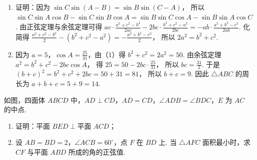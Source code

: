 \begin{solution}
\begin{enumerate}
\item 证明：因为
\(\sin C\sin \left( A-B \right)=\sin B\sin \left( C-A \right)\)，
所以
\(\sin C\sin A\cos B-\sin C\sin B\cos A =\sin B\sin C\cos A-\sin B\sin A\cos C\).
由正弦定理与余弦定理可得 \(ac\cdot \frac{a^2+c^2-b^2}{2ac}-2bc\cdot \frac{b^2+c^2-a^2}{2bc}=-ab\cdot \frac{a^2+b^2-c^2}{2ab}\).
化简得
\(\frac{a^2+c^2-b^2}{2}-\left( b^2+c^2-a^2 \right) =-\frac{a^2+b^2-c^2}{2}\)，
所以
\(2a^2=b^2+c^2\).

\item 因为 \(a=5\)，\(\cos A=\frac{25}{31}\)，由（1）得
\(b^2+c^2=2a^2=50\).
由余弦定理
\(a^2=b^2+c^2-2bc\cos A\)，
得
\(25=50-2bc\cdot \frac{25}{31}\)，
所以
\(bc=\frac{31}{2}\).
于是
\(\left( b+c \right)^2=b^2+c^2+2bc=50+31=81\)，
所以
\(b+c=9\).
因此 \(\triangle ABC\) 的周长为
\(a+b+c=5+9=14\).
\end{enumerate}
\end{solution}

\begin{problem}
如图，四面体 \(ABCD\) 中，\(AD\perp CD\)，\(AD=CD\)，\(\angle ADB=\angle BDC\)，\(E\) 为 \(AC\) 的中点.

\begin{enumerate}
\item 证明：\(\text{平面 }BED\perp \text{平面 }ACD\)；
\item 设 \(AB=BD=2\)，\(\angle ACB=60^\circ\)，点 \(F\) 在 \(BD\) 上. 当 \(\triangle AFC\) 面积最小时，求 \(CF\) 与平面 \(ABD\) 所成的角的正弦值.
\end{enumerate}

\end{problem}

